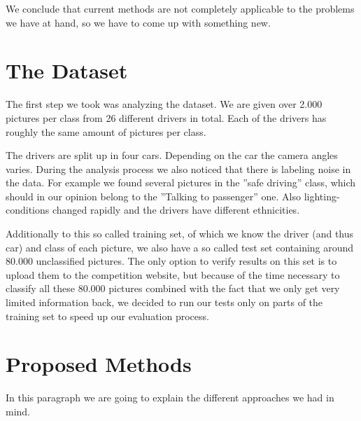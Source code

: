 \documentclass[10pt,twocolumn,letterpaper]{article}
\begin{document}
We conclude that current methods are not completely applicable to the problems we have at hand, so we have to come up with something new.




\section{The Dataset}
The first step we took was analyzing the dataset. We are given over 2.000 pictures per class from 26 different drivers in total. Each of the drivers has roughly the same amount of pictures per class. 

The drivers are split up in four cars. Depending on the car the camera angles varies. During the analysis process we also noticed that there is labeling noise in the data. For example we found several pictures in the ''safe driving'' class, which should in our opinion belong to the ''Talking to passenger'' one. Also lighting-conditions changed rapidly and the drivers have different ethnicities.


Additionally to this so called training set, of which we know the driver (and thus car) and class of each picture, we also have a so called test set containing around 80.000 unclassified pictures. The only option to verify results on this set is to upload them to the competition website, but because of the time necessary to classify all these 80.000 pictures combined with the fact that we only get very limited information back, we decided to run our tests only on parts of the training set to speed up our evaluation process.



\section{Proposed Methods}
In this paragraph we are going to explain the different approaches we had in mind.
\end{document}
